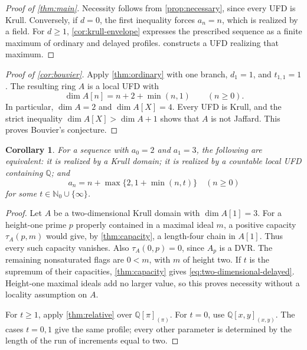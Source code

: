 \documentclass[11pt,reqno]{amsart}
\numberwithin{equation}{section}
\theoremstyle{plain}
\newtheorem{corollary}[theorem]{Corollary}
\theoremstyle{definition}
\theoremstyle{remark}
\begin{document}
\begin{proof}[Proof of \cref{thm:main}]
Necessity follows from \cref{prop:necessary}, since every UFD
is Krull. Conversely, if \(d=0\), the first inequality forces
\(a_n=n\), which is realized by a field. For \(d\ge1\),
\cref{cor:krull-envelope} expresses the prescribed sequence as a finite
maximum of ordinary and delayed profiles. 
constructs a UFD realizing that maximum.
\end{proof}

\begin{proof}[Proof of \cref{cor:bouvier}]
Apply \cref{thm:ordinary} with one branch, \(d_1=1\), and
\(t_{1,1}=1\). The resulting ring \(A\) is a local UFD with
\[
 \dim A[n]=n+2+\min(n,1)\qquad(n\ge0).
\]
In particular, \(\dim A=2\) and \(\dim A[X]=4\).
Every UFD is Krull, and the strict inequality
\(\dim A[X]>\dim A+1\) shows that \(A\) is not Jaffard.
This proves Bouvier's conjecture.
\end{proof}

\begin{corollary}\label{cor:two-dimensional-minimal}
For a sequence with \(a_0=2\) and \(a_1=3\), the following
are equivalent: it is realized by a Krull domain; it is realized
by a countable local UFD containing \(\mathbb Q\); and
\begin{equation}\label{eq:two-dimensional-delayed}
 a_n=n+\max\{2,1+\min(n,t)\}
 \quad(n\ge0)
\end{equation}
for some \(t\in\mathbb N_0\cup\{\infty\}\).
\end{corollary}
\begin{proof}
Let \(A\) be a two-dimensional Krull domain with
\(\dim A[1]=3\). For a height-one prime \(p\) properly
contained in a maximal ideal \(m\), a positive capacity
\(\tau_A(p,m)\) would give, by \cref{thm:capacity}, a
length-four chain in \(A[1]\). Thus every such capacity
vanishes. Also \(\tau_A(0,p)=0\), since \(A_p\) is a DVR.
The remaining nonsaturated flags are \(0<m\), with \(m\)
of height two. If \(t\) is the supremum of their capacities,
\cref{thm:capacity} gives \eqref{eq:two-dimensional-delayed}.
Height-one maximal ideals add no larger value, so this proves
necessity without a locality assumption on \(A\).

For \(t\ge1\), apply \cref{thm:relative} over
\(\mathbb Q[\pi]_{(\pi)}\). For \(t=0\), use
\(\mathbb Q[x,y]_{(x,y)}\). The cases \(t=0,1\) give
the same profile; every other parameter is determined by the
length of the run of increments equal to two.
\end{proof}
\end{document}
